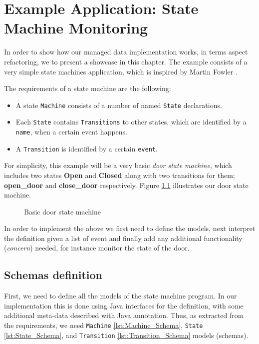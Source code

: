 
\chapter{Example Application: State Machine Monitoring}\label{Example Application}
In order to show how our managed data implementation works, in terms aspect refactoring, we to present a showcase in this chapter.
The example consists of a very simple state machines application, which is inspired by Martin Fowler \cite{fowler2010domain}.

The requirements of a state machine are the following: 
\begin{itemize}
	\item A state \texttt{Machine} consists of a number of named \texttt{State} declarations.

	\item Each \texttt{State} contains \texttt{Transitions} to other states, which are identified by a \texttt{name}, when a certain event happens.

	\item A \texttt{Transition} is identified by a certain \texttt{event}.
\end{itemize}

For simplicity, this example will be a very basic \textit{door state machine}, which includes two states \textbf{Open} and \textbf{Closed} along with two transitions for them; \textbf{open\_door} and \textbf{close\_door} respectively.
Figure \ref{fig:State_machine} illustrates our door state machine.

\begin{figure}[H]
	\centering
  	\caption{Basic door state machine}
  	\label{fig:State_machine}
\end{figure}

In order to implement the above we first need to define the models, next interpret the definition given a list of event and finally add any additional functionality (\textit{concern}) needed, for instance monitor the state of the door.

\section{Schemas definition}
First, we need to define all the models of the state machine program. 
In our implementation this is done using Java interfaces for the definition, with some additional meta-data described with Java annotation.
Thus, as extracted from the requirements, we need \texttt{Machine} \ref{lst:Machine_Schema}, \texttt{State} \ref{lst:State_Schema}, and \texttt{Transition} \ref{lst:Transition_Schema} models (schemas).

